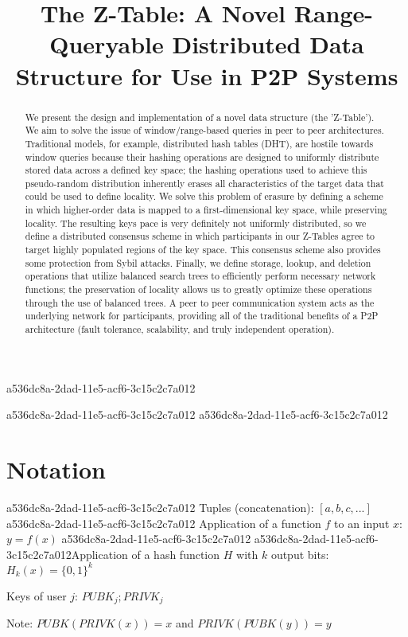 \documentclass[12pt]{article}
\title{The Z-Table: A Novel Range-Queryable Distributed Data Structure for Use in P2P Systems}
\begin{document}
a536dc8a-2dad-11e5-acf6-3c15c2c7a012\maketitle
a536dc8a-2dad-11e5-acf6-3c15c2c7a012
a536dc8a-2dad-11e5-acf6-3c15c2c7a012\begin{abstract}
We present the design and implementation of a novel data structure (the 'Z-Table'). We aim to solve the issue of window/range-based queries in peer to peer architectures. Traditional models, for example,  distributed hash tables (DHT), are hostile towards window queries because their hashing operations are designed to uniformly distribute stored data across a defined key space; the hashing operations used to achieve this pseudo-random distribution inherently erases all characteristics of the target data that could be used to define locality. We solve this problem of erasure by defining a scheme in which higher-order data is mapped to a first-dimensional key space, while preserving locality. The resulting keys pace is very definitely not uniformly distributed, so we define a distributed consensus scheme in which participants in our Z-Tables agree to target highly populated regions of the key space. This consensus scheme also provides some protection from Sybil attacks. Finally, we define storage, lookup, and deletion operations that utilize balanced search trees to efficiently perform necessary network functions; the preservation of locality allows us to greatly optimize these operations through the use of balanced trees. A peer to peer communication system acts as the underlying network for participants, providing all of the traditional benefits of a P2P architecture (fault tolerance, scalability, and truly independent operation).
\end{abstract}

\section{Notation}
a536dc8a-2dad-11e5-acf6-3c15c2c7a012
Tuples (concatenation): $[a,b,c,...]$
a536dc8a-2dad-11e5-acf6-3c15c2c7a012
Application of a function $f$ to an input $x$: $y=f(x)$
a536dc8a-2dad-11e5-acf6-3c15c2c7a012
a536dc8a-2dad-11e5-acf6-3c15c2c7a012Application of a hash function $H$ with $k$ output bits: $H_{k}(x) = \{0,1\}^k$

Keys of user $j$: $ PUBK_j; PRIVK_j $

Note: $PUBK(PRIVK(x)) = x$ and $PRIVK(PUBK(y)) = y$~
\end{document}

